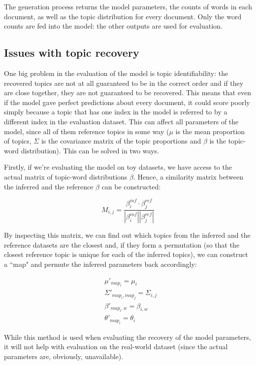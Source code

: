 \documentclass[12pt,a4paper,twoside,openright]{report}
\begin{document}
The generation process returns the model parameters, the counts of words in each document, as well as the topic distribution for every document. Only the word counts are fed into the model: the other outputs are used for evaluation.

\subsection{Issues with topic recovery}

One big problem in the evaluation of the model is topic identifiability: the recovered topics are not at all guaranteed to be in the correct order and if they are close together, they are not guaranteed to be recovered. This means that even if the model gave perfect predictions about every document, it could score poorly simply because a topic that has one index in the model is referred to by a different index in the evaluation dataset. This can affect all parameters of the model, since all of them reference topics in some way ($\mu$ is the mean proportion of topics, $\Sigma$ is the covariance matrix of the topic proportions and $\beta$ is the topic-word distribution). This can be solved in two ways.

Firstly, if we're evaluating the model on toy datasets, we have access to the actual matrix of topic-word distributions $\beta$. Hence, a similarity matrix between the inferred and the reference $\beta$ can be constructed:

\begin{equation}\label{eq:beta_similarity matrix}
M_{i,j} = \frac{\beta^{inf}_i \cdot \beta^{ref}_j}{|\beta^{inf}_i||\beta^{ref}_j|}
\end{equation}

By inspecting this matrix, we can find out which topics from the inferred and the reference datasets are the closest and, if they form a permutation (so that the closest reference topic is unique for each of the inferred topics), we can construct a ``map" and permute the inferred parameters back accordingly:

\begin{align*}
&\mu'_{map_i} = \mu_i \\
&\Sigma'_{map_i, map_j} = \Sigma_{i, j} \\
&\beta'_{map_i, w} = \beta_{i, w} \\
&\theta'_{map_i} = \theta_i
\end{align*}

While this method is used when evaluating the recovery of the model parameters, it will not help with evaluation on the real-world dataset (since the actual parameters are, obviously, unavailable).
\end{document}
